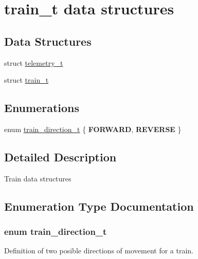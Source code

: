 \hypertarget{group__train__t__structs}{\section{train\-\_\-t data structures}
\label{group__train__t__structs}
}
\subsection*{Data Structures}
\begin{DoxyCompactItemize}
\item 
struct \hyperlink{structtelemetry__t}{telemetry\-\_\-t}
\item 
struct \hyperlink{structtrain__t}{train\-\_\-t}
\end{DoxyCompactItemize}
\subsection*{Enumerations}
\begin{DoxyCompactItemize}
\item 
enum \hyperlink{group__train__t__structs_gae1037d4e4a5a1fe1c4bbe139091ef3a2}{train\-\_\-direction\-\_\-t} \{ {\bfseries F\-O\-R\-W\-A\-R\-D}, 
{\bfseries R\-E\-V\-E\-R\-S\-E}
 \}
\end{DoxyCompactItemize}


\subsection{Detailed Description}
Train data structures 

\subsection{Enumeration Type Documentation}
\hypertarget{group__train__t__structs_gae1037d4e4a5a1fe1c4bbe139091ef3a2}{
\subsubsection[{train\-\_\-direction\-\_\-t}]{\setlength{\rightskip}{0pt plus 5cm}enum {\bf train\-\_\-direction\-\_\-t}}}\label{group__train__t__structs_gae1037d4e4a5a1fe1c4bbe139091ef3a2}
Definition of two posible directions of movement for a train. 